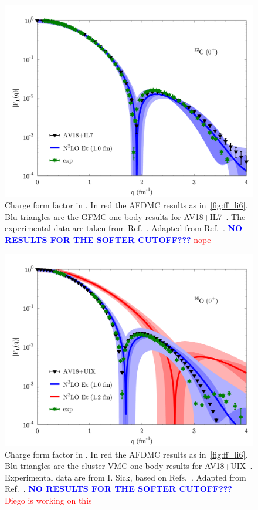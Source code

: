\documentclass[aps,prc,twocolumn,superscriptaddress,showpacs,floatfix,nofootinbib]{revtex4-1}
\newcommand{\red}[1]{\protect\textcolor{red}{#1}}
\newcommand{\blue}[1]{\protect\textcolor{blue}{#1}}
\begin{document}
\begin{figure}[htb]
\includegraphics[width=\linewidth]{ff_c12.pdf}
\caption[]{Charge form factor in . 
In red the AFDMC results as in~\cref{fig:ff_li6}.
Blu triangles are the GFMC one-body results for AV18+IL7~\cite{Lovato:2013}.
The experimental data are taken from Ref.~\cite{Devries:1987}.
Adapted from Ref.~\cite{Lonardoni:2017afdmc}.
\blue{\bf NO RESULTS FOR THE SOFTER CUTOFF???}
\red{nope}}
\label{fig:ff_c12}
\end{figure}

\begin{figure}[htb]
\includegraphics[width=\linewidth]{ff_o16.pdf}
\caption[]{Charge form factor in .
In red the AFDMC results as in~\cref{fig:ff_li6}.
Blu triangles are the cluster-VMC one-body results for AV18+UIX~\cite{Lonardoni:2017cvmc}.
Experimental data are from I. Sick, based on Refs.~\cite{Sick:1970,Schuetz:1975,Sick:1975}.
Adapted from Ref.~\cite{Lonardoni:2017afdmc}.
\blue{\bf NO RESULTS FOR THE SOFTER CUTOFF???}
\red{Diego is working on this}}
\label{fig:ff_o16}
\end{figure}
\end{document}

